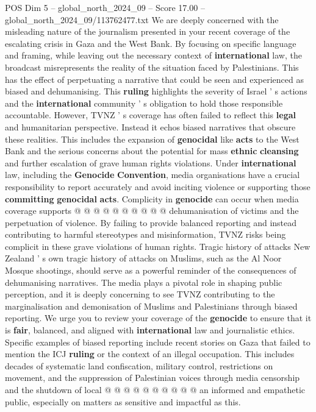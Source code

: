\begin{textsample}{POS Dim 5 – global\_north\_2024\_09 – Score 17.00 – global\_north\_2024\_09/113762477.txt}  \label{ex:f5_pos_352}
We are deeply concerned with the misleading nature of the journalism presented in your recent coverage of the escalating crisis in Gaza and the West Bank.
By focusing on specific language and framing, while leaving out the necessary context of \textbf{international} law, the broadcast misrepresents the reality of the situation faced by Palestinians.
This has the effect of perpetuating a narrative that could be seen and experienced as biased and dehumanising.
This \textbf{ruling} highlights the severity of Israel ' s actions and the \textbf{international} community ' s obligation to hold those responsible accountable.
However, TVNZ ' s coverage has often failed to reflect this \textbf{legal} and humanitarian perspective.
Instead it echos biased narratives that obscure these realities.
This includes the expansion of \textbf{genocidal} like \textbf{acts} to the West Bank and the serious concerns about the potential for mass \textbf{ethnic} \textbf{cleansing} and further escalation of grave human rights violations.
Under \textbf{international} law, including the \textbf{Genocide} \textbf{Convention}, media organisations have a crucial responsibility to report accurately and avoid inciting violence or supporting those \textbf{committing} \textbf{genocidal} \textbf{acts}.
Complicity in \textbf{genocide} can occur when media coverage supports @ @ @ @ @ @ @ @ @ @ dehumanisation of victims and the perpetuation of violence.
By failing to provide balanced reporting and instead contributing to harmful stereotypes and misinformation, TVNZ risks being complicit in these grave violations of human rights.
Tragic history of attacks New Zealand ' s own tragic history of attacks on Muslims, such as the Al Noor Mosque shootings, should serve as a powerful reminder of the consequences of dehumanising narratives.
The media plays a pivotal role in shaping public perception, and it is deeply concerning to see TVNZ contributing to the marginalisation and demonisation of Muslims and Palestinians through biased reporting.
We urge you to review your coverage of the \textbf{genocide} to ensure that it is \textbf{fair}, balanced, and aligned with \textbf{international} law and journalistic ethics.
Specific examples of biased reporting include recent stories on Gaza that failed to mention the ICJ \textbf{ruling} or the context of an illegal occupation.
This includes decades of systematic land confiscation, military control, restrictions on movement, and the suppression of Palestinian voices through media censorship and the shutdown of local @ @ @ @ @ @ @ @ @ @ an informed and empathetic public, especially on matters as sensitive and impactful as this.

\end{textsample}
